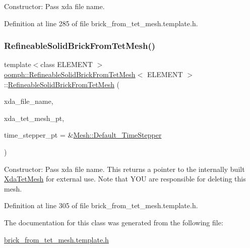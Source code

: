 Constructor\+: Pass xda file name. 



Definition at line 285 of file brick\+\_\+from\+\_\+tet\+\_\+mesh.\+template.\+h.

\mbox{\label{classoomph_1_1RefineableSolidBrickFromTetMesh_a178ef2547dfaa31b2f88e50b26315d00}} 
\subsubsection{\texorpdfstring{Refineable\+Solid\+Brick\+From\+Tet\+Mesh()}{RefineableSolidBrickFromTetMesh()}\hspace{0.1cm}{\footnotesize\ttfamily [2/2]}}
{\footnotesize\ttfamily template$<$class E\+L\+E\+M\+E\+NT $>$ \\
\hyperlink{classoomph_1_1RefineableSolidBrickFromTetMesh}{oomph\+::\+Refineable\+Solid\+Brick\+From\+Tet\+Mesh}$<$ E\+L\+E\+M\+E\+NT $>$\+::\hyperlink{classoomph_1_1RefineableSolidBrickFromTetMesh}{Refineable\+Solid\+Brick\+From\+Tet\+Mesh} (\begin{DoxyParamCaption}\item[{const std\+::string}]{xda\+\_\+file\+\_\+name,  }\item[{\hyperlink{classoomph_1_1XdaTetMesh}{Xda\+Tet\+Mesh}$<$ \hyperlink{classoomph_1_1TElement}{T\+Element}$<$ 3, 3 $>$ $>$ $\ast$\&}]{xda\+\_\+tet\+\_\+mesh\+\_\+pt,  }\item[{\hyperlink{classoomph_1_1TimeStepper}{Time\+Stepper} $\ast$}]{time\+\_\+stepper\+\_\+pt = {\ttfamily \&\hyperlink{classoomph_1_1Mesh_a12243d0fee2b1fcee729ee5a4777ea10}{Mesh\+::\+Default\+\_\+\+Time\+Stepper}} }\end{DoxyParamCaption})\hspace{0.3cm}{\ttfamily [inline]}}



Constructor\+: Pass xda file name. This returns a pointer to the internally built \hyperlink{classoomph_1_1XdaTetMesh}{Xda\+Tet\+Mesh} for external use. Note that Y\+OU are responsible for deleting this mesh. 



Definition at line 305 of file brick\+\_\+from\+\_\+tet\+\_\+mesh.\+template.\+h.



The documentation for this class was generated from the following file\+:\begin{DoxyCompactItemize}
\item 
\hyperlink{brick__from__tet__mesh_8template_8h}{brick\+\_\+from\+\_\+tet\+\_\+mesh.\+template.\+h}\end{DoxyCompactItemize}
